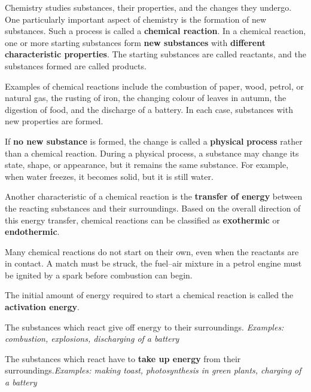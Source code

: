 \ResponseGap


Chemistry studies substances, their properties, and the changes they undergo. One particularly important aspect of chemistry is the formation of new substances. Such a process is called a \textbf{chemical reaction}. In a chemical reaction, one or more starting substances form \textbf{new substances} with \textbf{different characteristic properties}. The starting substances are called reactants, and the substances formed are called products.


Examples of chemical reactions include the combustion of paper, wood, petrol, or natural gas, the rusting of iron, the changing colour of leaves in autumn, the digestion of food, and the discharge of a battery. In each case, substances with new properties are formed.


If \textbf{no new substance} is formed, the change is called a \textbf{physical }\textbf{process} rather than a chemical reaction. During a physical process, a substance may change its state, shape, or appearance, but it remains the same substance. For example, when water freezes, it becomes solid, but it is still water.


Another characteristic of a chemical reaction is the \textbf{transfer of energy} between the reacting substances and their surroundings. Based on the overall direction of this energy transfer, chemical reactions can be classified as \textbf{exothermic} or \textbf{endothermic}.


Many chemical reactions do not start on their own, even when the reactants are in contact. A match must be struck, the fuel--air mixture in a petrol engine must be ignited by a spark before combustion can begin.


The initial amount of energy required to start a chemical reaction is called the \textbf{activation energy}.

\begin{InfoBox}
    The substances which react give off energy to their surroundings. \newline \textit{Examples: combustion, explosions, discharging of a battery}
\end{InfoBox}

\ResponseGap[200pt]

\newpage

\begin{InfoBox}
The substances which react have to \textbf{take up energy} from their surroundings.\newline \textit{Examples: making toast, photosynthesis in green plants, charging of a battery}
\end{InfoBox}

